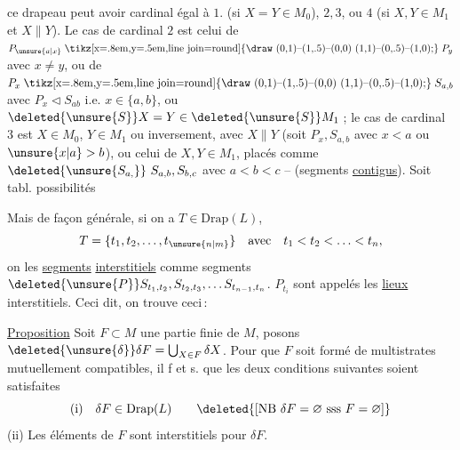  ce drapeau peut avoir cardinal égal à $1$. (si $X=Y\in M_0$), $2,3$, ou $4$ (si $X,Y\in M_1$ et $X\parallel Y$). Le cas de cardinal $2$ est celui de $P_{\unsure{a|x}} \mathrel{\vcenter{\hbox{\tikz[x=.8em,y=.5em,line join=round]{\draw (0,1)--(1,.5)--(0,0) (1,1)--(0,.5)--(1,0);}}}} P_y$ avec $x\ne y$, ou de $P_x \mathrel{\vcenter{\hbox{\tikz[x=.8em,y=.5em,line join=round]{\draw (0,1)--(1,.5)--(0,0) (1,1)--(0,.5)--(1,0);}}}} S_{a,b}$ avec $P_x\triangleleft S_{ab}$ i.e. $x\in\{a,b\}$, ou $\deleted{\unsure{S}}X=Y\in\deleted{\unsure{S}}M_1$\,; le cas de cardinal $3$ est $X\in M_0$, $Y\in M_1$ ou inversement, avec $X\parallel Y$ (soit $P_x,S_{a,b}$ avec $x<a$ ou $\unsure{x|a}>b$), ou celui de $X,Y\in M_1$, placés comme $\deleted{\unsure{S_{a,}}}\ S_{a,b},S_{b,c}$ avec $a<b<c$ -- (segments \uline{contigus}). Soit tabl. possibilités

Mais de façon générale, si on a $T\in\mathrm{Drap}(L)$,
\[
 T=\{t_1,t_2,\ldots,t_{\unsure{n|m}}\}\quad\text{avec}\quad t_1<t_2<\ldots<t_n,
\]
on  les \uline{segments} \uline{interstitiels}  comme segments $\deleted{\unsure{P}}S_{t_1,t_2},S_{t_2,t_3},\ldots S_{t_{n-1},t_n}$.   $P_{t_i}$ sont appelés les \uline{lieux} interstitiels. Ceci dit, on trouve ceci\,:

\uline{Proposition} Soit $F\subset M$ une partie finie  de $M$, posons $\deleted{\unsure{\delta}}\delta F=\bigcup_{X\in F}\delta X$. Pour que $F$ soit formé de multistrates mutuellement compatibles, il f et s. que les deux conditions suivantes soient satisfaites
\[
 \text{(i)}\quad\delta F\in\mathrm{Drap}(L)
 \qquad\deleted{[\text{NB }\delta F=\varnothing\ \text{sss}\ F=\varnothing]}
\]
(ii) Les éléments de $F$ sont interstitiels pour $\delta F$.

